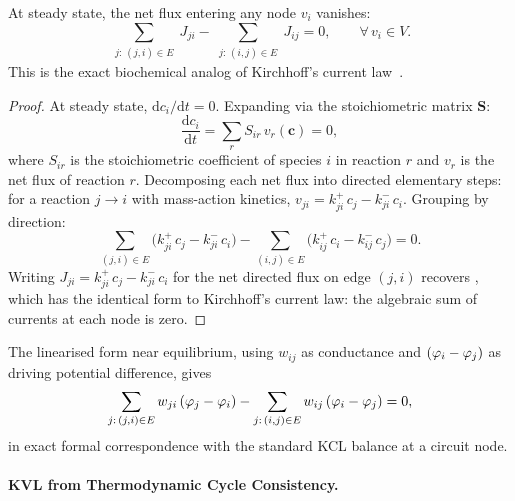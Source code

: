 \begin{theorem}
\label{thm:biochem-kcl}
At steady state, the net flux entering any node $v_i$ vanishes:
\begin{equation}
  \sum_{\substack{j:\,(j,i)\in E}} J_{ji}
  - \sum_{\substack{j:\,(i,j)\in E}} J_{ij}
  = 0,
  \qquad \forall\, v_i \in V.
  \label{eq:ch08-kcl}
\end{equation}
This is the exact biochemical analog of Kirchhoff's current
law~\citep{Kirchhoff1847}.
\end{theorem}

\begin{proof}
At steady state, $\mathrm{d}c_i/\mathrm{d}t = 0$.  Expanding via the
stoichiometric matrix $\mathbf{S}$:
\begin{equation}
  \frac{\mathrm{d}c_i}{\mathrm{d}t}
  = \sum_{r} S_{ir}\,v_r(\mathbf{c})
  = 0,
\end{equation}
where $S_{ir}$ is the stoichiometric coefficient of species $i$ in
reaction $r$ and $v_r$ is the net flux of reaction $r$.  Decomposing
each net flux into directed elementary steps: for a reaction $j \to i$
with mass-action kinetics, $v_{ji} = k_{ji}^{+}\,c_j - k_{ji}^{-}\,c_i$.
Grouping by direction:
\begin{equation}
  \sum_{(j,i)\in E} \bigl(k_{ji}^{+}\,c_j - k_{ji}^{-}\,c_i\bigr)
  - \sum_{(i,j)\in E} \bigl(k_{ij}^{+}\,c_i - k_{ij}^{-}\,c_j\bigr)
  = 0.
\end{equation}
Writing $J_{ji} = k_{ji}^{+}\,c_j - k_{ji}^{-}\,c_i$ for the net
directed flux on edge $(j,i)$ recovers , which has
the identical form to Kirchhoff's current law: the algebraic sum of
currents at each node is zero.
\end{proof}

The linearised form near equilibrium, using $w_{ij}$ as conductance and
$(\varphi_i - \varphi_j)$ as driving potential difference, gives
\begin{equation}
  \sum_{j:\,(j,i)\in E} w_{ji}\,(\varphi_j - \varphi_i)
  - \sum_{j:\,(i,j)\in E} w_{ij}\,(\varphi_i - \varphi_j) = 0,
  \label{eq:ch08-kcl-linear}
\end{equation}
in exact formal correspondence with the standard KCL balance at a
circuit node.

\paragraph{KVL from Thermodynamic Cycle Consistency.}

